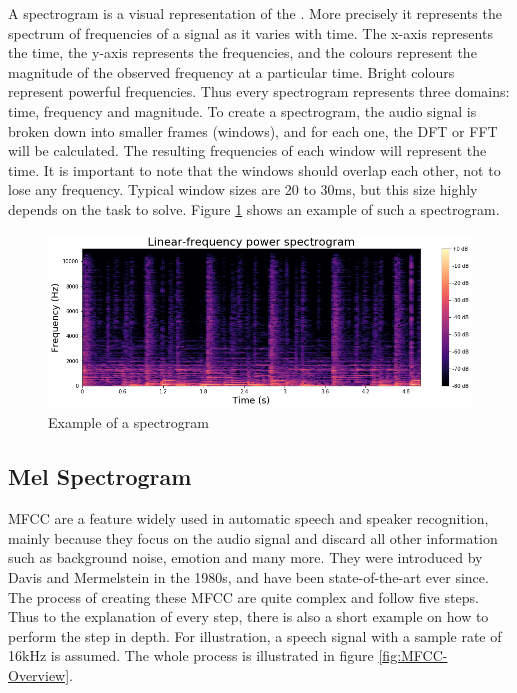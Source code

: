 A spectrogram is a visual representation of the . More precisely it represents the spectrum of frequencies of a signal as it varies with time. The x-axis represents the time, the y-axis represents the frequencies, and the colours represent the magnitude of the observed frequency at a particular time. Bright colours represent powerful frequencies. Thus every spectrogram represents three domains: time, frequency and magnitude.
\newline
\newline
To create a spectrogram, the audio signal is broken down into smaller frames (windows), and for each one, the \gls{DFT} or \gls{FFT} will be calculated. The resulting frequencies of each window will represent the time. It is important to note that the windows should overlap each other, not to lose any frequency. Typical window sizes are 20 to 30ms, but this size highly depends on the task to solve. Figure \ref{fig:Spectrogram} shows an example of such a spectrogram.
\begin{figure}[htbp]
	\centering
	\includegraphics[scale=0.5]{baa-documentation/img/Spectrogram_Visualisation.png}
	\caption[Example of a spectrogram]{Example of a spectrogram}
	\label{fig:Spectrogram}
\end{figure}

\subsection{Mel Spectrogram}
\label{sub:Mel-Spectrogram}

\gls{MFCC} are a feature widely used in automatic speech and speaker recognition, mainly because they focus on the audio signal and discard all other information such as background noise, emotion and many more. They were introduced by Davis and Mermelstein in the 1980s, and have been state-of-the-art ever since.
\newline
\newline
The process of creating these \gls{MFCC} are quite complex and follow five steps. Thus to the explanation of every step, there is also a short example on how to perform the step in depth. For illustration, a speech signal with a sample rate of 16kHz is assumed. The whole process is illustrated in figure \ref{fig:MFCC-Overview}.

